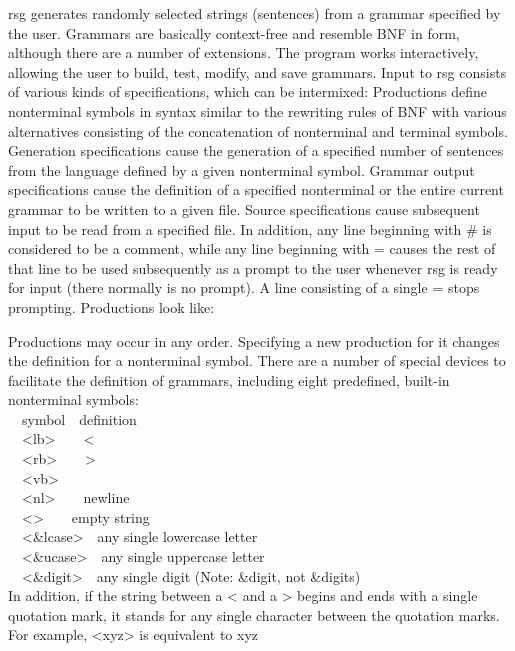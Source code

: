 {\textsf{rsg} generates randomly selected strings
({\textquotedbl}sentences{\textquotedbl}) from a grammar specified by
the user. Grammars are basically context-free and resemble BNF in form,
although there are a number of extensions. The program works
interactively, allowing the user to build, test, modify, and save
grammars. Input to \textsf{rsg} consists of various kinds of
specifications, which can be intermixed: Productions define nonterminal
symbols in syntax similar to the rewriting rules of BNF with various
alternatives consisting of the concatenation of nonterminal and
terminal symbols. Generation specifications cause the generation of a
specified number of sentences from the language defined by a given
nonterminal symbol. Grammar output specifications cause the definition
of a specified nonterminal or the entire current grammar to be written
to a given file. Source specifications cause subsequent input to be
read from a specified file. In addition, any line beginning with \# is
considered to be a comment, while any line beginning with = causes the
rest of that line to be used subsequently as a prompt to the user
whenever \textsf{rsg} is ready for input (there normally is no prompt).
A line consisting of a single = stops prompting. Productions look like:


Productions may occur in any order. Specifying a new production for it
changes the definition for a nonterminal symbol. There are a number of
special devices to facilitate the definition of grammars, including
eight predefined, built-in nonterminal symbols:\\
\ \ symbol\ \ definition\\
\ \ {\textless}lb{\textgreater}\ \ \ \ {\textless}\\
\ \ {\textless}rb{\textgreater}\ \ \ \ {\textgreater}\\
\ \ {\textless}vb{\textgreater}\ \ \ \ {\textbar}\\
\ \ {\textless}nl{\textgreater}\ \ \ \ newline\\
\ \ {\textless}{\textgreater}\ \ \ \ empty string\\
\ \ {\textless}\&lcase{\textgreater}\ \ any single lowercase
letter\\
\ \ {\textless}\&ucase{\textgreater}\ \ any single uppercase
letter\\
\ \ {\textless}\&digit{\textgreater}\ \ any single digit (Note: \&digit,
not \&digits)\\
In addition, if the string between a {\textless} and a {\textgreater}
begins and ends with a single quotation mark, it stands for any single
character between the quotation marks. For example,
{\textless}{\textquotesingle}xyz{\textquotesingle}{\textgreater} is
equivalent to x{\textbar}y{\textbar}z

}
